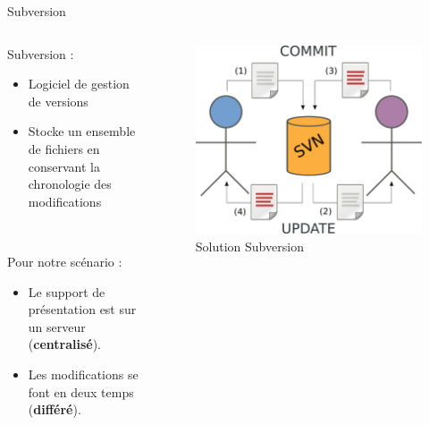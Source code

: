 \begin{frame}{Subversion}
\begin{columns}
  \begin{column}{.5\textwidth}
  Subversion :
  \begin{itemize}
    \item Logiciel de gestion de versions
    \item Stocke un ensemble de fichiers en conservant la chronologie des
    modifications 
  \end{itemize}~

  Pour notre scénario :
  \begin{itemize}
    \item Le support de présentation est sur un serveur (\textbf{centralisé}).
    \item Les modifications se font en deux temps (\textbf{différé}).
  \end{itemize}
  \end{column}

  \begin{column}{.45\textwidth}
  \begin{figure}
    \center
    \includegraphics[width=.9\textwidth]{includes/svn.pdf}
    \caption{Solution Subversion}
  \end{figure}
  \end{column}
\end{columns}
\end{frame}

